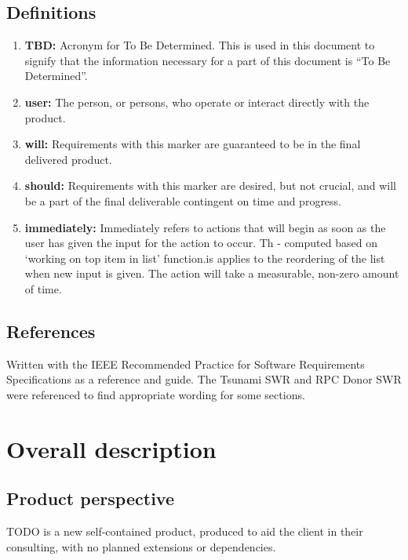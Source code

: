 \documentclass[12pt,a4paper]{article}
\begin{document}
\subsection{Definitions}
\begin{enumerate}
\item \textbf{TBD:} Acronym for To Be Determined. This is used in this document to signify that the information necessary for a part of this document is ``To Be Determined''.
\item \textbf{user:} The person, or persons, who operate or interact directly with the product.
\item \textbf{will:} Requirements with this marker are guaranteed to be in the final delivered product.
\item \textbf{should:} Requirements with this marker are desired, but not crucial, and will
be a part of the final deliverable contingent on time and progress.
\item \textbf{immediately:} Immediately refers to actions that will begin as soon as the user has given the input for the action to occur.  Th - computed based on `working on top item in list' function.is applies to the reordering of the list when new input is given.  The action will take a measurable, non-zero amount of time.
\end{enumerate}

\subsection{References}
Written with the IEEE Recommended Practice for Software Requirements Specifications as a reference and guide. The Tsunami SWR and RPC Donor SWR were referenced to find appropriate wording for some sections.

\section{Overall description}
\subsection{Product perspective}
TODO is a new self-contained product, produced to aid the client in their consulting, with no planned extensions or dependencies.
\end{document}
